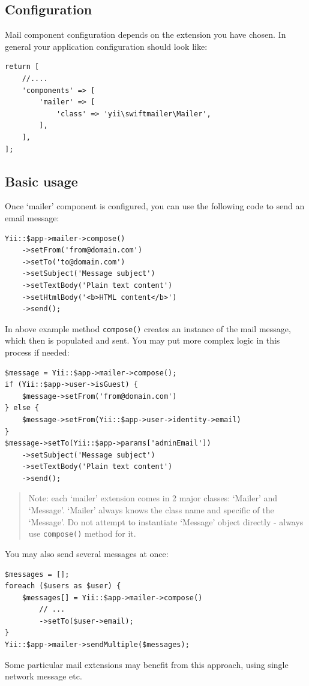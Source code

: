 \subsection{Configuration}
Mail component configuration depends on the extension you have chosen.
In general your application configuration should look like:

\lstset{language=php}\begin{lstlisting}
return [
    //....
    'components' => [
        'mailer' => [
            'class' => 'yii\swiftmailer\Mailer',
        ],
    ],
];
\end{lstlisting}
\subsection{Basic usage}
Once `mailer' component is configured, you can use the following code to send an email message:

\lstset{language=php}\begin{lstlisting}
Yii::$app->mailer->compose()
    ->setFrom('from@domain.com')
    ->setTo('to@domain.com')
    ->setSubject('Message subject')
    ->setTextBody('Plain text content')
    ->setHtmlBody('<b>HTML content</b>')
    ->send();
\end{lstlisting}
In above example method \lstinline|compose()| creates an instance of the mail message, which then is populated and sent.
You may put more complex logic in this process if needed:

\lstset{language=php}\begin{lstlisting}
$message = Yii::$app->mailer->compose();
if (Yii::$app->user->isGuest) {
    $message->setFrom('from@domain.com')
} else {
    $message->setFrom(Yii::$app->user->identity->email)
}
$message->setTo(Yii::$app->params['adminEmail'])
    ->setSubject('Message subject')
    ->setTextBody('Plain text content')
    ->send();
\end{lstlisting}
\begin{quote}Note: each `mailer' extension comes in 2 major classes: `Mailer' and `Message'. `Mailer' always knows
  the class name and specific of the `Message'. Do not attempt to instantiate `Message' object directly -
  always use \lstinline|compose()| method for it.

\end{quote}
You may also send several messages at once:

\lstset{language=php}\begin{lstlisting}
$messages = [];
foreach ($users as $user) {
    $messages[] = Yii::$app->mailer->compose()
        // ...
        ->setTo($user->email);
}
Yii::$app->mailer->sendMultiple($messages);
\end{lstlisting}
Some particular mail extensions may benefit from this approach, using single network message etc.

